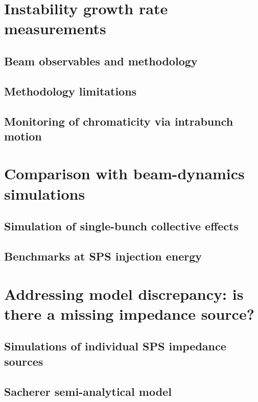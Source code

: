 \section{Instability growth rate measurements}

\subsection{Beam observables and methodology}

\subsection{Methodology limitations}

\subsection{Monitoring of chromaticity via intrabunch motion}

\section{Comparison with beam-dynamics simulations}

\subsection{Simulation of single-bunch collective effects}

\subsection{Benchmarks at SPS injection energy}

\section{Addressing model discrepancy: is there a missing impedance source?}

\subsection{Simulations of individual SPS impedance sources}

\subsection{Sacherer semi-analytical model}

